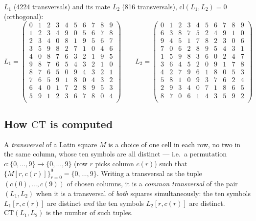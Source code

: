 \documentclass[11pt,a4paper]{article}
\theoremstyle{remark}
\newcommand{\CT}{\mathrm{CT}}
\newcommand{\cl}{\mathrm{cl}}
\begin{document}
$L_1$ (4224 transversals) and its mate $L_2$ (816 transversals),
$\cl(L_1,L_2)=0$ (orthogonal):
\[
L_1=\begin{pmatrix}
  0 & 1 & 2 & 3 & 4 & 5 & 6 & 7 & 8 & 9 \\
  1 & 2 & 3 & 4 & 9 & 0 & 5 & 6 & 7 & 8 \\
  2 & 3 & 4 & 0 & 8 & 1 & 9 & 5 & 6 & 7 \\
  3 & 5 & 9 & 8 & 2 & 7 & 1 & 0 & 4 & 6 \\
  4 & 0 & 8 & 7 & 6 & 3 & 2 & 1 & 9 & 5 \\
  9 & 8 & 7 & 6 & 5 & 4 & 3 & 2 & 1 & 0 \\
  8 & 7 & 6 & 5 & 0 & 9 & 4 & 3 & 2 & 1 \\
  7 & 6 & 5 & 9 & 1 & 8 & 0 & 4 & 3 & 2 \\
  6 & 4 & 0 & 1 & 7 & 2 & 8 & 9 & 5 & 3 \\
  5 & 9 & 1 & 2 & 3 & 6 & 7 & 8 & 0 & 4 \\
\end{pmatrix}
\qquad
L_2=\begin{pmatrix}
  0 & 1 & 2 & 3 & 4 & 5 & 6 & 7 & 8 & 9 \\
  6 & 3 & 8 & 7 & 5 & 2 & 4 & 9 & 1 & 0 \\
  9 & 4 & 5 & 1 & 7 & 8 & 2 & 3 & 0 & 6 \\
  7 & 0 & 6 & 2 & 8 & 9 & 5 & 4 & 3 & 1 \\
  1 & 5 & 9 & 8 & 3 & 6 & 0 & 2 & 4 & 7 \\
  3 & 6 & 4 & 5 & 2 & 0 & 9 & 1 & 7 & 8 \\
  4 & 2 & 7 & 9 & 6 & 1 & 8 & 0 & 5 & 3 \\
  5 & 8 & 1 & 0 & 9 & 3 & 7 & 6 & 2 & 4 \\
  2 & 9 & 3 & 4 & 0 & 7 & 1 & 8 & 6 & 5 \\
  8 & 7 & 0 & 6 & 1 & 4 & 3 & 5 & 9 & 2 \\
\end{pmatrix}
\]

\subsection*{How $\CT$ is computed}

A \emph{transversal} of a Latin square $M$ is a choice of one cell in each
row, no two in the same column, whose ten symbols are all distinct --- i.e.\
a permutation $c:\{0,\dots,9\}\to\{0,\dots,9\}$ (row $r$ picks column $c(r)$)
such that $\{M[r,c(r)]\}_{r=0}^{9}=\{0,\dots,9\}$. Writing a transversal as
the tuple $(c(0),\dots,c(9))$ of chosen columns, it is a \emph{common
transversal} of the pair $(L_1,L_2)$ when it is a transversal of \emph{both}
squares simultaneously: the ten symbols $L_1[r,c(r)]$ are distinct \emph{and}
the ten symbols $L_2[r,c(r)]$ are distinct. $\CT(L_1,L_2)$ is the number of
such tuples.
\end{document}
